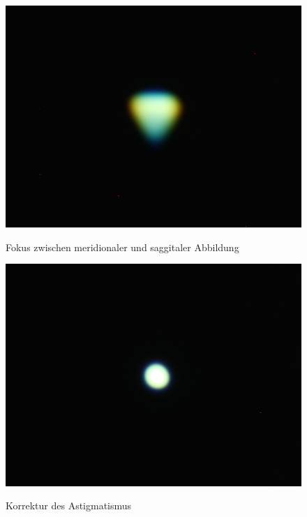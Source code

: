\begin{figure}[htb]
	\begin{minipage}[t]{0.48\textwidth}
		\includegraphics[width=\linewidth]{img/Astigmatismus/Prakt_Linsenfehler_2015_06_04_089_mittenfokus}
		\label{fig:astigmatismus_mittenfokus}
		\caption{Fokus zwischen meridionaler und saggitaler Abbildung}
	\end{minipage}
	\hfill
	\begin{minipage}[t]{0.48\textwidth}
		\includegraphics[width=\linewidth]{img/Astigmatismus/Prakt_Linsenfehler_2015_06_04_086}
		\label{fig:astigmatismus_korrigiert}
		\caption{Korrektur des Astigmatismus}
	\end{minipage}
\end{figure}

